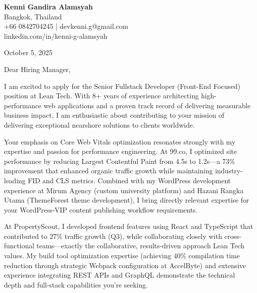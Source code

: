 \documentclass[11pt,a4paper]{article}
\begin{document}
\begin{flushleft}
\textbf{\Large Kenni Gandira Alamsyah}\\
Bangkok, Thailand\\
+66 0842704245 | devkenni.g@gmail.com\\
linkedin.com/in/kenni-g-alamsyah
\end{flushleft}

\vspace{1em}

October 5, 2025

\vspace{1em}

Dear Hiring Manager,

\vspace{1em}

I am excited to apply for the Senior Fullstack Developer (Front-End Focused) position at Lean Tech. With 8+ years of experience architecting high-performance web applications and a proven track record of delivering measurable business impact, I am enthusiastic about contributing to your mission of delivering exceptional nearshore solutions to clients worldwide.

\vspace{1em}

Your emphasis on Core Web Vitals optimization resonates strongly with my expertise and passion for performance engineering. At 99.co, I optimized site performance by reducing Largest Contentful Paint from 4.5s to 1.2s---a 73\% improvement that enhanced organic traffic growth while maintaining industry-leading FID and CLS metrics. Combined with my WordPress development experience at Mirum Agency (custom university platform) and Hazani Rangka Utama (ThemeForest theme development), I bring directly relevant expertise for your WordPress-VIP content publishing workflow requirements.

\vspace{1em}

At PropertyScout, I developed frontend features using React and TypeScript that contributed to 27\% traffic growth (Q3), while collaborating closely with cross-functional teams---exactly the collaborative, results-driven approach Lean Tech values. My build tool optimization expertise (achieving 40\% compilation time reduction through strategic Webpack configuration at AccelByte) and extensive experience integrating REST APIs and GraphQL demonstrate the technical depth and full-stack capabilities you're seeking.

\vspace{1em}
\end{document}
